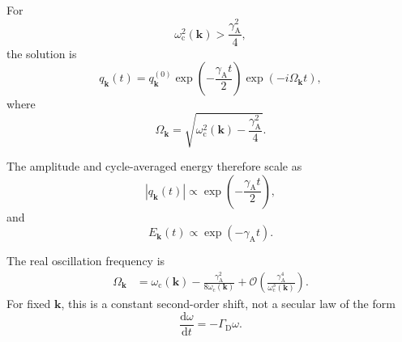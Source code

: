 For
\begin{equation}
    \omega_{\mathrm c}^{2}(\mathbf k)
    >
    \frac{
        \gamma_{\mathrm A}^{2}
    }{
        4
    },
    \label{eq:photon_relaxation_underdamped_condition}
\end{equation}
the solution is
\begin{equation}
    q_{\mathbf k}(t)
    =
    q_{\mathbf k}^{(0)}
    \exp
    \left(
        -
        \frac{
            \gamma_{\mathrm A}t
        }{
            2
        }
    \right)
    \exp
    \left(
        -i\Omega_{\mathbf k}t
    \right),
    \label{eq:photon_relaxation_damped_mode_solution}
\end{equation}
where
\begin{equation}
    \Omega_{\mathbf k}
    =
    \sqrt{
        \omega_{\mathrm c}^{2}(\mathbf k)
        -
        \frac{
            \gamma_{\mathrm A}^{2}
        }{
            4
        }
    }.
    \label{eq:photon_relaxation_damped_frequency_definition}
\end{equation}

The amplitude and cycle-averaged energy therefore scale as
\begin{equation}
    \left|
        q_{\mathbf k}(t)
    \right|
    \propto
    \exp
    \left(
        -
        \frac{
            \gamma_{\mathrm A}t
        }{
            2
        }
    \right),
    \label{eq:photon_relaxation_amplitude_attenuation}
\end{equation}
and
\begin{equation}
    E_{\mathbf k}(t)
    \propto
    \exp
    \left(
        -
        \gamma_{\mathrm A}t
    \right).
    \label{eq:photon_relaxation_linear_attenuation}
\end{equation}

The real oscillation frequency is
\begin{align}
    \Omega_{\mathbf k}
    &=
    \omega_{\mathrm c}(\mathbf k)
    -
    \frac{
        \gamma_{\mathrm A}^{2}
    }{
        8\omega_{\mathrm c}(\mathbf k)
    }
    +
    \mathcal{O}
    \left(
        \frac{
            \gamma_{\mathrm A}^{4}
        }{
            \omega_{\mathrm c}^{3}(\mathbf k)
        }
    \right).
    \label{eq:photon_relaxation_damped_real_frequency}
\end{align}
For fixed \(\mathbf k\), this is a constant second-order shift, not a secular
law of the form
\begin{equation}
    \frac{
        \mathrm d\omega
    }{
        \mathrm dt
    }
    =
    -\Gamma_{\mathrm D}\omega.
    \label{eq:photon_relaxation_frequency_drift_target}
\end{equation}

